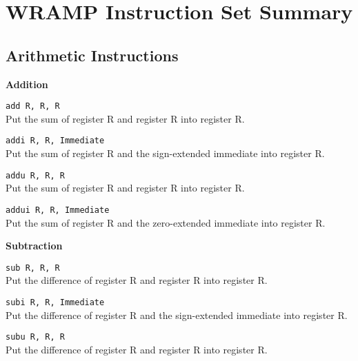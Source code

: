 \documentclass[12pt]{report}
\newcommand\subscr[1]{\raisebox{-0.5ex}{\small #1}}
\newcommand\regs{R\subscr{s}}
\newcommand\regd{R\subscr{d}}
\newcommand\regt{R\subscr{t}}
\begin{document}
\setcounter{secnumdepth}{0}


\section{WRAMP Instruction Set Summary}


\subsection{Arithmetic Instructions}
\noindent
{\bf Addition}

\texttt{add \regd, \regs, \regt}\\
Put the sum of register \regs{} and register \regt{}
into register \regd{}.
\vspace{1ex}

\texttt{addi \regd, \regs, Immediate}\\
Put the sum of register \regs{} and the sign-extended immediate
into register \regd{}.
\vspace{1ex}

\texttt{addu \regd, \regs, \regt}\\
Put the sum of register \regs{} and register \regt{}
into register \regd{}.
\vspace{1ex}

\texttt{addui \regd, \regs, Immediate}\\
Put the sum of register \regs{} and the zero-extended immediate
into register \regd{}.
\vspace{1ex}

\noindent
{\bf Subtraction}

\texttt{sub \regd, \regs, \regt}\\
Put the difference of register \regs{} and register \regt{}
into register \regd{}.
\vspace{1ex}

\texttt{subi \regd, \regs, Immediate}\\
Put the difference of register \regs{} and the sign-extended immediate
into register \regd{}.
\vspace{1ex}

\texttt{subu \regd, \regs, \regt}\\
Put the difference of register \regs{} and register \regt{}
into register \regd{}.
\vspace{1ex}
\end{document}
